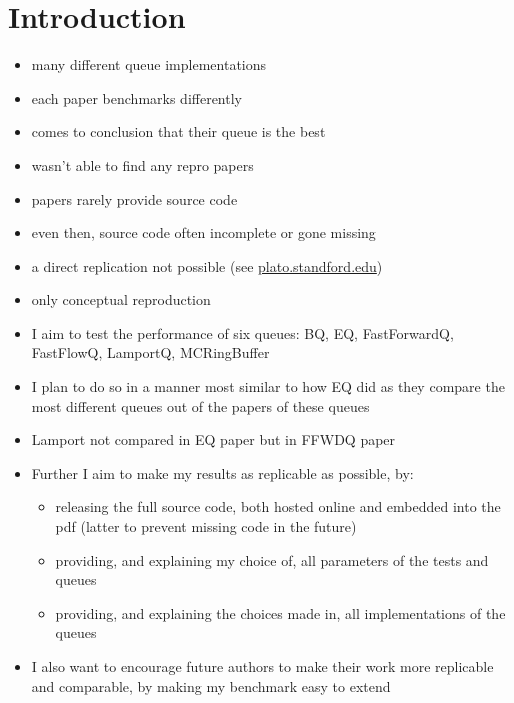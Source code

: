 \section{Introduction}
\begin{itemize}
    \item many different queue implementations
    \item each paper benchmarks differently
    \item comes to conclusion that their queue is the best
    \item wasn't able to find any repro papers
    \item papers rarely provide source code
    \item even then, source code often incomplete or gone missing
    \item a direct replication not possible (see
            \href{https://plato.stanford.edu/entries/scientific-reproducibility/#:~:text=direct
                replication%
                conceptual%
                to%
        }{plato.standford.edu})
    \item only conceptual reproduction
    \item I aim to test the performance of six queues: BQ, EQ, FastForwardQ, FastFlowQ, LamportQ, MCRingBuffer
    \item I plan to do so in a manner most similar to how EQ did as they compare the most different
        queues out of the papers of these queues
    \item Lamport not compared in EQ paper but in FFWDQ paper
    \item Further I aim to make my results as replicable as possible, by:
        \begin{itemize}
            \item releasing the full source code, both hosted online and embedded into the pdf
                (latter to prevent missing code in the future)
            \item providing, and explaining my choice of, all parameters of the tests and queues
            \item providing, and explaining the choices made in, all implementations of the queues
        \end{itemize}
    \item I also want to encourage future authors to make their work more replicable and comparable,
        by making my benchmark easy to extend 
\end{itemize}
